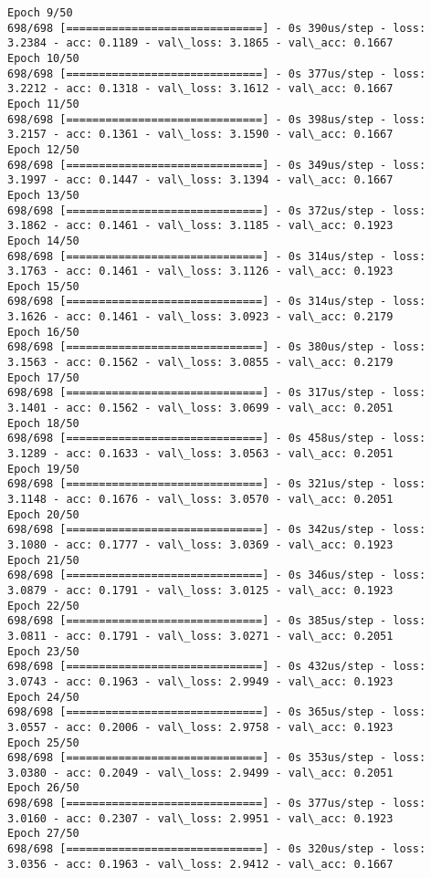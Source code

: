 \documentclass[11pt]{article}
\begin{document}
\begin{Verbatim}[commandchars=\\\{\}]
Epoch 9/50
698/698 [==============================] - 0s 390us/step - loss: 3.2384 - acc: 0.1189 - val\_loss: 3.1865 - val\_acc: 0.1667
Epoch 10/50
698/698 [==============================] - 0s 377us/step - loss: 3.2212 - acc: 0.1318 - val\_loss: 3.1612 - val\_acc: 0.1667
Epoch 11/50
698/698 [==============================] - 0s 398us/step - loss: 3.2157 - acc: 0.1361 - val\_loss: 3.1590 - val\_acc: 0.1667
Epoch 12/50
698/698 [==============================] - 0s 349us/step - loss: 3.1997 - acc: 0.1447 - val\_loss: 3.1394 - val\_acc: 0.1667
Epoch 13/50
698/698 [==============================] - 0s 372us/step - loss: 3.1862 - acc: 0.1461 - val\_loss: 3.1185 - val\_acc: 0.1923
Epoch 14/50
698/698 [==============================] - 0s 314us/step - loss: 3.1763 - acc: 0.1461 - val\_loss: 3.1126 - val\_acc: 0.1923
Epoch 15/50
698/698 [==============================] - 0s 314us/step - loss: 3.1626 - acc: 0.1461 - val\_loss: 3.0923 - val\_acc: 0.2179
Epoch 16/50
698/698 [==============================] - 0s 380us/step - loss: 3.1563 - acc: 0.1562 - val\_loss: 3.0855 - val\_acc: 0.2179
Epoch 17/50
698/698 [==============================] - 0s 317us/step - loss: 3.1401 - acc: 0.1562 - val\_loss: 3.0699 - val\_acc: 0.2051
Epoch 18/50
698/698 [==============================] - 0s 458us/step - loss: 3.1289 - acc: 0.1633 - val\_loss: 3.0563 - val\_acc: 0.2051
Epoch 19/50
698/698 [==============================] - 0s 321us/step - loss: 3.1148 - acc: 0.1676 - val\_loss: 3.0570 - val\_acc: 0.2051
Epoch 20/50
698/698 [==============================] - 0s 342us/step - loss: 3.1080 - acc: 0.1777 - val\_loss: 3.0369 - val\_acc: 0.1923
Epoch 21/50
698/698 [==============================] - 0s 346us/step - loss: 3.0879 - acc: 0.1791 - val\_loss: 3.0125 - val\_acc: 0.1923
Epoch 22/50
698/698 [==============================] - 0s 385us/step - loss: 3.0811 - acc: 0.1791 - val\_loss: 3.0271 - val\_acc: 0.2051
Epoch 23/50
698/698 [==============================] - 0s 432us/step - loss: 3.0743 - acc: 0.1963 - val\_loss: 2.9949 - val\_acc: 0.1923
Epoch 24/50
698/698 [==============================] - 0s 365us/step - loss: 3.0557 - acc: 0.2006 - val\_loss: 2.9758 - val\_acc: 0.1923
Epoch 25/50
698/698 [==============================] - 0s 353us/step - loss: 3.0380 - acc: 0.2049 - val\_loss: 2.9499 - val\_acc: 0.2051
Epoch 26/50
698/698 [==============================] - 0s 377us/step - loss: 3.0160 - acc: 0.2307 - val\_loss: 2.9951 - val\_acc: 0.1923
Epoch 27/50
698/698 [==============================] - 0s 320us/step - loss: 3.0356 - acc: 0.1963 - val\_loss: 2.9412 - val\_acc: 0.1667

\end{Verbatim}
\end{document}

